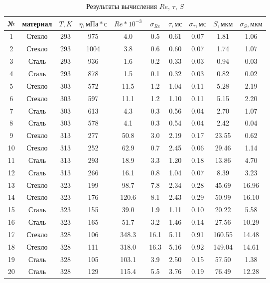 \documentclass[a4paper, 12pt]{article}
\begin{document}
    \begin{table}[!ht]
        \centering
        \begin{tabular}{|c|c|c|c|c|c|c|c|c|c|}
            \hline
            № & материал & $T, K$ & $\eta, мПа * с$ & $Re * 10^{-3}$ & $\sigma_{Re}$ & $\tau, мс$ & $\sigma_{\tau}, мс$ & $S, мкм$ & $\sigma_S, мкм$ \\ \hline
             1 & Стекло & 293 & 975 & 4.0   & 0.5 & 0.61 & 0.07 & 1.81 & 1.06 \\ \hline
             2 & Стекло & 293 & 1004& 3.8   & 0.6 & 0.60 & 0.07 & 1.74 & 1.07 \\ \hline
             3 & Сталь  & 293 & 936 & 1.6   & 0.2 & 0.33 & 0.03 & 0.94 & 0.03 \\ \hline
             4 & Сталь  & 293 & 878 & 1.5   & 0.1 & 0.32 & 0.03 & 0.82 & 0.02 \\ \hline
             5 & Стекло & 303 & 572 & 11.5  & 1.2 & 1.04 & 0.11 & 5.28 & 2.19 \\ \hline
             6 & Стекло & 303 & 597 & 11.1  & 1.2 & 1.10 & 0.11 & 5.15 & 2.20 \\ \hline
             7 & Сталь  & 303 & 613 & 4.3   & 0.3 & 0.56 & 0.04 & 2.70 & 1.07 \\ \hline
             8 & Сталь  & 303 & 578 & 4.1   & 0.3 & 0.54 & 0.04 & 2.42 & 0.04 \\ \hline
             9 & Стекло & 313 & 277 & 50.8  & 3.0 & 2.19 & 0.17 & 23.55 & 0.62 \\ \hline
            10 & Стекло & 313 & 252 & 62.9  & 0.7 & 2.45 & 0.06 & 29.46 & 1.14 \\ \hline
            11 & Сталь  & 313 & 293 & 18.9  & 3.3 & 1.20 & 0.18 & 13.86 & 4.70 \\ \hline
            12 & Сталь  & 313 & 266 & 16.1  & 0.8 & 1.04 & 0.07 & 8.39 & 3.23 \\ \hline
            13 & Стекло & 323 & 199 & 98.7  & 7.8 & 2.34 & 0.28 & 45.69 & 16.96 \\ \hline
            14 & Стекло & 323 & 176 & 120.6 & 8.1 & 2.43 & 0.29 & 50.99 & 16.10 \\ \hline
            15 & Сталь  & 323 & 155 & 39.0  & 1.9 & 1.11 & 0.10 & 20.22 & 5.58 \\ \hline
            16 & Сталь  & 323 & 165 & 51.7  & 3.2 & 1.46 & 0.14 & 27.56 & 10.29 \\ \hline
            17 & Стекло & 328 & 106 & 348.3 & 16.1 & 5.11 & 0.91 & 160.55 & 14.48 \\ \hline
            18 & Стекло & 328 & 111 & 318.0 & 16.3 & 5.16 & 0.92 & 149.04 & 14.61 \\ \hline
            19 & Сталь  & 328 & 105 & 103.1 & 3.9 & 2.50 & 0.15 & 57.50 & 1.38 \\ \hline
            20 & Сталь  & 328 & 129 & 115.4 & 5.5 & 3.76 & 0.19 & 76.49 & 12.28 \\ \hline        \end{tabular}
        \caption{Результаты вычисления $Re$, $\tau$, $S$}
        \label{re_tau_s}
    \end{table}
\end{document}
